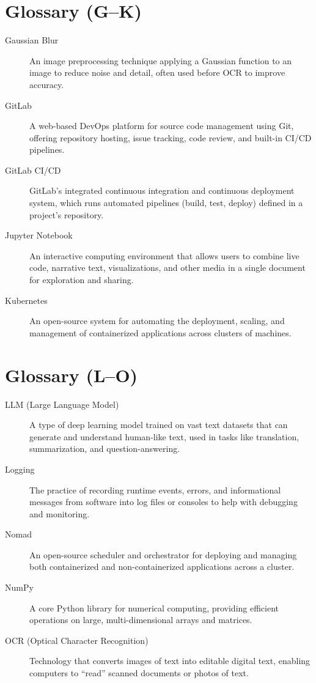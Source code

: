 \section*{Glossary (G–K)}
\begin{description}
  \item[Gaussian Blur] 
    An image preprocessing technique applying a Gaussian function to an image to 
    reduce noise and detail, often used before OCR to improve accuracy.
  \item[GitLab] 
    A web-based DevOps platform for source code management using Git, offering 
    repository hosting, issue tracking, code review, and built-in CI/CD pipelines.
  \item[GitLab CI/CD] 
    GitLab’s integrated continuous integration and continuous deployment system, 
    which runs automated pipelines (build, test, deploy) defined in a project’s repository.
  \item[Jupyter Notebook] 
    An interactive computing environment that allows users to combine live code, 
    narrative text, visualizations, and other media in a single document for exploration and sharing.
  \item[Kubernetes] 
    An open-source system for automating the deployment, scaling, and management of 
    containerized applications across clusters of machines.
\end{description}
\section*{Glossary (L–O)}
\begin{description}
  \item[LLM (Large Language Model)] 
    A type of deep learning model trained on vast text datasets that can generate 
    and understand human-like text, used in tasks like translation, summarization, and question-answering.
  \item[Logging] 
    The practice of recording runtime events, errors, and informational messages 
    from software into log files or consoles to help with debugging and monitoring.
  \item[Nomad] 
    An open-source scheduler and orchestrator for deploying and managing both containerized and non-containerized applications across a cluster.
  \item[NumPy] 
    A core Python library for numerical computing, providing efficient operations on 
    large, multi-dimensional arrays and matrices.
  \item[OCR (Optical Character Recognition)] 
    Technology that converts images of text into editable digital text, enabling  
    computers to “read” scanned documents or photos of text.
\end{description}
